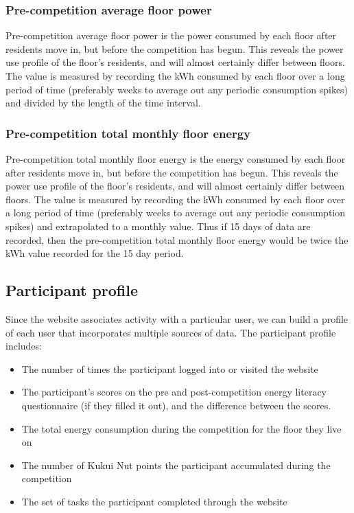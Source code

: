 \subsubsection{Pre-competition average floor power}
Pre-competition average floor power is the power consumed by each floor after residents move in, but before the competition has begun. This reveals the power use profile of the floor's residents, and will almost certainly differ between floors. The value is measured by recording the kWh consumed by each floor over a long period of time (preferably weeks to average out any periodic consumption spikes) and divided by the length of the time interval.

\subsubsection{Pre-competition total monthly floor energy}
Pre-competition total monthly floor energy is the energy consumed by each floor after residents move in, but before the competition has begun. This reveals the power use profile of the floor's residents, and will almost certainly differ between floors. The value is measured by recording the kWh consumed by each floor over a long period of time (preferably weeks to average out any periodic consumption spikes) and extrapolated to a monthly value. Thus if 15 days of data are recorded, then the pre-competition total monthly floor energy would be twice the kWh value recorded for the 15 day period.

\subsection{Participant profile}
\label{sec:participant-profile}

Since the website associates activity with a particular user, we can build a profile of each user that incorporates multiple sources of data. The participant profile includes:

\begin{itemize}
\item The number of times the participant logged into or visited the website
\item The participant's scores on the pre and post-competition energy literacy questionnaire (if they filled it out), and the difference between the scores.
\item The total energy consumption during the competition for the floor they live on
\item The number of Kukui Nut points the participant accumulated during the competition
\item The set of tasks the participant completed through the website
\end{itemize}

